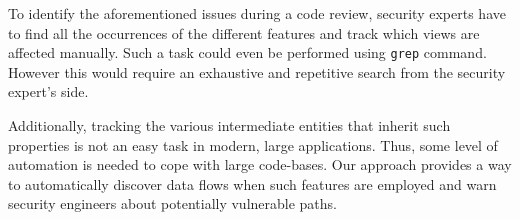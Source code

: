 To identify the aforementioned issues
during a code review,
security experts have to find all
the occurrences 
of the different features and
track which views are affected manually.
Such a task could even be performed
using {\tt grep} command.
However this would require an
exhaustive  and repetitive search
from the security expert's side.

Additionally, 
tracking the various intermediate entities that inherit 
such properties is not an easy task in modern,
large applications. 
Thus,
some level of automation is
needed to cope with 
large code-bases.
Our approach provides a way to
automatically discover 
data flows when such features
are employed and 
warn security engineers
about potentially vulnerable paths.

\vspace{-2mm}
